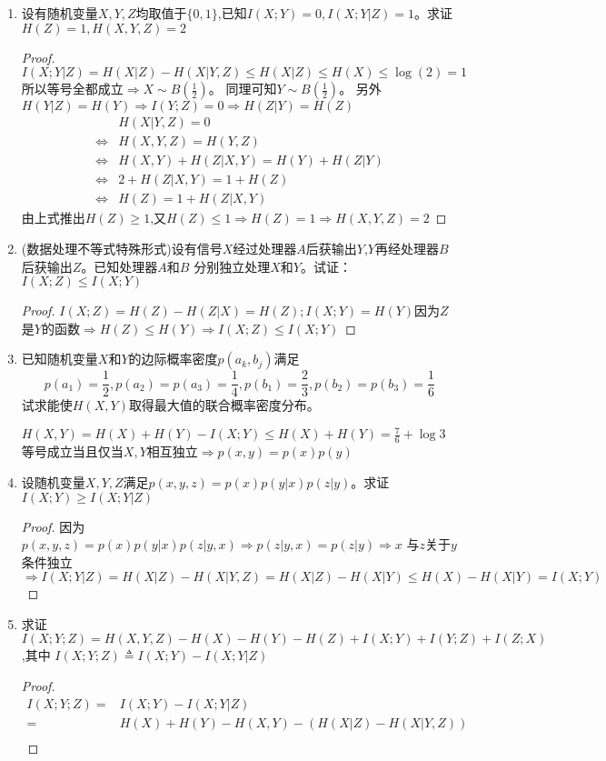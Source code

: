 \documentclass[a4paper]{article}
\begin{document}
\begin{enumerate}[label=\thehwcnt.\arabic*.]
\begin{solution}
\end{solution}
\item 设有随机变量$X,Y,Z$均取值于$\{0,1\}$,已知$I(X;Y)=0,I(X;Y|Z)=1$。求证$H(Z)=1,H(X,Y,Z)=2$
\begin{proof}
$I(X;Y|Z)=H(X|Z)-H(X|Y,Z)\leq H(X|Z)\leq H(X)\leq \log(2)=1$
所以等号全都成立$\Rightarrow X\sim B(\frac{1}{2})$。
同理可知$Y\sim B(\frac{1}{2})$。
另外$H(Y|Z)=H(Y)\Rightarrow I(Y;Z)=0\Rightarrow H(Z|Y)=H(Z)$
\begin{align*}
&H(X|Y,Z)=0 \\
\iff &H(X,Y,Z)=H(Y,Z)\\
\iff &H(X,Y)+H(Z|X,Y)=H(Y)+H(Z|Y)\\
\iff &2+H(Z|X,Y)=1+H(Z)\\
\iff &H(Z)=1+H(Z|X,Y)
\end{align*}
由上式推出$H(Z)\geq 1$,又$H(Z)\leq 1\Rightarrow H(Z)=1\Rightarrow H(X,Y,Z)=2$
\end{proof}
\item
(数据处理不等式特殊形式)设有信号$X$经过处理器$A$后获输出$Y$,$Y$再经处理器$B$后获输出$Z$。已知处理器$A$和$B$
分别独立处理$X$和$Y$。试证：$I(X;Z)\leq I(X;Y)$
\begin{proof}
$I(X;Z)=H(Z)-H(Z|X)=H(Z);I(X;Y)=H(Y)$因为$Z$是$Y$的函数$\Rightarrow H(Z)\leq H(Y) \Rightarrow I(X;Z)\leq I(X;Y)$
\end{proof}
\item 已知随机变量$X$和$Y$的边际概率密度$p(a_k,b_j)$满足
$$
p(a_1)=\frac{1}{2},p(a_2)=p(a_3)=\frac{1}{4},p(b_1)=\frac{2}{3},p(b_2)=p(b_3)=\frac{1}{6}
$$
试求能使$H(X,Y)$取得最大值的联合概率密度分布。
\begin{solution}
$H(X,Y)=H(X)+H(Y)-I(X;Y)\leq H(X)+H(Y)=\frac{7}{6}+\log 3$
等号成立当且仅当$X,Y$相互独立$\Rightarrow p(x,y)=p(x)p(y)$
\end{solution}
\item 设随机变量$X,Y,Z$满足$p(x,y,z)=p(x)p(y|x)p(z|y)$。求证$I(X;Y)\geq I(X;Y|Z)$
\begin{proof}
因为$p(x,y,z)=p(x)p(y|x)p(z|y,x)\Rightarrow p(z|y,x)=p(z|y)\Rightarrow x$ 与$z$关于$y$条件独立$\Rightarrow I(X;Y|Z)=H(X|Z)-H(X|Y,Z)= H(X|Z)-H(X|Y)\leq H(X)-H(X|Y) =I(X;Y)$
\end{proof}
\item 求证$I(X;Y;Z)=H(X,Y,Z)-H(X)-H(Y)-H(Z)+I(X;Y)+I(Y;Z)+I(Z;X)$,其中
$I(X;Y;Z)\triangleq I(X;Y)-I(X;Y|Z)$
\begin{proof}
\begin{align*}
I(X;Y;Z) =& I(X;Y)-I(X;Y|Z) \\
=& H(X)+H(Y)-H(X,Y)-(H(X|Z)-H(X|Y,Z))\\

\end{align*}
\end{proof}
\end{enumerate}
\end{document}
